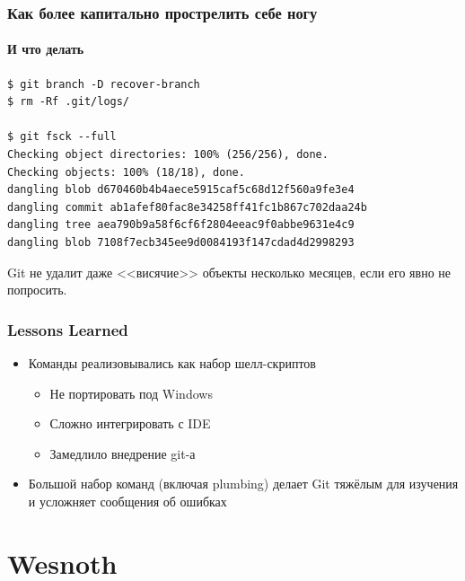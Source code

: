 \documentclass{../../slides-style}
\begin{document}
    \begin{frame}[fragile]
        \frametitle{Как более капитально прострелить себе ногу}
        \framesubtitle{И что делать}
        \begin{verbatim}
$ git branch -D recover-branch
$ rm -Rf .git/logs/

$ git fsck --full
Checking object directories: 100% (256/256), done.
Checking objects: 100% (18/18), done.
dangling blob d670460b4b4aece5915caf5c68d12f560a9fe3e4
dangling commit ab1afef80fac8e34258ff41fc1b867c702daa24b
dangling tree aea790b9a58f6cf6f2804eeac9f0abbe9631e4c9
dangling blob 7108f7ecb345ee9d0084193f147cdad4d2998293
        \end{verbatim}
        Git не удалит даже <<висячие>> объекты несколько месяцев, если его явно не попросить.
    \end{frame}

    \begin{frame}
        \frametitle{Lessons Learned}
        \begin{itemize}
            \item Команды реализовывались как набор шелл-скриптов
            \begin{itemize}
                \item Не портировать под Windows
                \item Сложно интегрировать с IDE
                \item Замедлило внедрение git-а
            \end{itemize}
            \item Большой набор команд (включая plumbing) делает Git тяжёлым для изучения и усложняет сообщения об ошибках
        \end{itemize}
    \end{frame}

    \section{Wesnoth}
\end{document}
